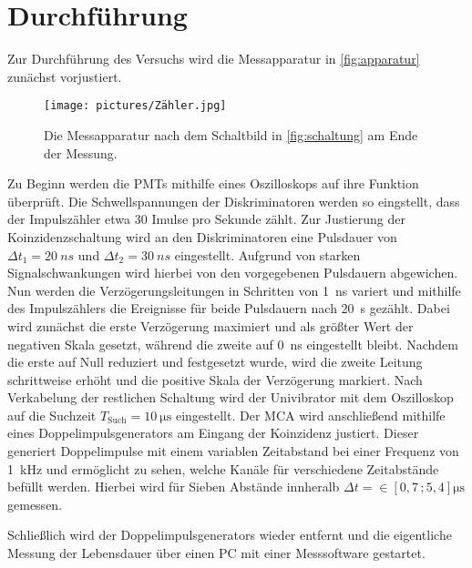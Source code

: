 \section{Durchführung}
\label{sec:Durchführung}

Zur Durchführung des Versuchs wird die Messapparatur in \autoref{fig:apparatur} zunächst vorjustiert.
\begin{figure}
    \centering
    \texttt{[image: pictures/Zähler.jpg]}
    \caption{Die Messapparatur nach dem Schaltbild in \autoref{fig:schaltung} am Ende der Messung.}
    \label{fig:apparatur}
\end{figure}

Zu Beginn werden die PMTs mithilfe eines Oszilloskops auf ihre Funktion überprüft.
Die Schwellspannungen der Diskriminatoren werden so eingstellt,
dass der Impulszähler etwa 30 Imulse pro Sekunde zählt.
Zur Justierung der Koinzidenzschaltung wird an den Diskriminatoren eine Pulsdauer von
$\Delta t_1 = \qty{20}{ns}$ und $\Delta t_2 = \qty{30}{ns}$ eingestellt.
Aufgrund von starken Signalschwankungen wird hierbei von den vorgegebenen Pulsdauern \cite{v01} abgewichen.
Nun werden die Verzögerungsleitungen in Schritten von \qty{1}{ns} variert 
und mithilfe des Impulszählers die Ereignisse für beide Pulsdauern nach \qty{20}{s} gezählt.
Dabei wird zunächst die erste Verzögerung maximiert und als größter Wert der negativen Skala gesetzt,
während die zweite auf \qty{0}{ns} eingestellt bleibt.
Nachdem die erste auf Null reduziert und festgesetzt wurde, wird die zweite Leitung schrittweise erhöht 
und die positive Skala der Verzögerung markiert.
Nach Verkabelung der restlichen Schaltung wird der Univibrator mit dem Oszilloskop auf die Suchzeit $T_\text{Such} = \qty{10}{\micro\second}$ eingestellt.
Der MCA wird anschließend mithilfe eines Doppelimpulsgenerators am Eingang der Koinzidenz justiert.
Dieser generiert Doppelimpulse mit einem variablen Zeitabstand bei einer Frequenz von \qty{1}{kHz}
und ermöglicht zu sehen, welche Kanäle für verschiedene Zeitabstände befüllt werden.
Hierbei wird für Sieben Abstände innheralb $\Delta t = \in [0,7 \, ; 5,4] \unit{\micro\second}$ gemessen.


Schließlich wird der Doppelimpulsgenerators wieder entfernt 
und die eigentliche Messung der Lebensdauer über einen PC mit einer Messsoftware gestartet.




